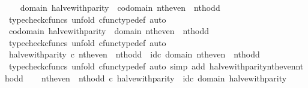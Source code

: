 \begin{isabellebody}
\ \ \isamarkupfalse%
\ {\isachardoublequoteopen}domain\ halve{\isacharunderscore}{\kern0pt}with{\isacharunderscore}{\kern0pt}parity\ {\isacharequal}{\kern0pt}\ codomain\ {\isacharparenleft}{\kern0pt}nth{\isacharunderscore}{\kern0pt}even\ {\isasymamalg}\ nth{\isacharunderscore}{\kern0pt}odd{\isacharparenright}{\kern0pt}{\isachardoublequoteclose}\isanewline
\ \ \ \ \isamarkupfalse%
\ {\isacharparenleft}{\kern0pt}typecheck{\isacharunderscore}{\kern0pt}cfuncs{\isacharcomma}{\kern0pt}\ unfold\ cfunc{\isacharunderscore}{\kern0pt}type{\isacharunderscore}{\kern0pt}def{\isacharcomma}{\kern0pt}\ auto{\isacharparenright}{\kern0pt}\isanewline
\ \ \isamarkupfalse%
\ {\isachardoublequoteopen}codomain\ halve{\isacharunderscore}{\kern0pt}with{\isacharunderscore}{\kern0pt}parity\ {\isacharequal}{\kern0pt}\ domain\ {\isacharparenleft}{\kern0pt}nth{\isacharunderscore}{\kern0pt}even\ {\isasymamalg}\ nth{\isacharunderscore}{\kern0pt}odd{\isacharparenright}{\kern0pt}{\isachardoublequoteclose}\isanewline
\ \ \ \ \isamarkupfalse%
\ {\isacharparenleft}{\kern0pt}typecheck{\isacharunderscore}{\kern0pt}cfuncs{\isacharcomma}{\kern0pt}\ unfold\ cfunc{\isacharunderscore}{\kern0pt}type{\isacharunderscore}{\kern0pt}def{\isacharcomma}{\kern0pt}\ auto{\isacharparenright}{\kern0pt}\isanewline
\ \ \isamarkupfalse%
\ {\isachardoublequoteopen}halve{\isacharunderscore}{\kern0pt}with{\isacharunderscore}{\kern0pt}parity\ {\isasymcirc}\isactrlsub c\ nth{\isacharunderscore}{\kern0pt}even\ {\isasymamalg}\ nth{\isacharunderscore}{\kern0pt}odd\ {\isacharequal}{\kern0pt}\ id\isactrlsub c\ {\isacharparenleft}{\kern0pt}domain\ {\isacharparenleft}{\kern0pt}nth{\isacharunderscore}{\kern0pt}even\ {\isasymamalg}\ nth{\isacharunderscore}{\kern0pt}odd{\isacharparenright}{\kern0pt}{\isacharparenright}{\kern0pt}{\isachardoublequoteclose}\isanewline
\ \ \ \ \isamarkupfalse%
\ {\isacharparenleft}{\kern0pt}typecheck{\isacharunderscore}{\kern0pt}cfuncs{\isacharcomma}{\kern0pt}\ unfold\ cfunc{\isacharunderscore}{\kern0pt}type{\isacharunderscore}{\kern0pt}def{\isacharcomma}{\kern0pt}\ auto\ simp\ add{\isacharcolon}{\kern0pt}\ halve{\isacharunderscore}{\kern0pt}with{\isacharunderscore}{\kern0pt}parity{\isacharunderscore}{\kern0pt}nth{\isacharunderscore}{\kern0pt}even{\isacharunderscore}{\kern0pt}nth{\isacharunderscore}{\kern0pt}odd{\isacharparenright}{\kern0pt}\isanewline
\ \ \isamarkupfalse%
\ {\isachardoublequoteopen}nth{\isacharunderscore}{\kern0pt}even\ {\isasymamalg}\ nth{\isacharunderscore}{\kern0pt}odd\ {\isasymcirc}\isactrlsub c\ halve{\isacharunderscore}{\kern0pt}with{\isacharunderscore}{\kern0pt}parity\ {\isacharequal}{\kern0pt}\ id\isactrlsub c\ {\isacharparenleft}{\kern0pt}domain\ halve{\isacharunderscore}{\kern0pt}with{\isacharunderscore}{\kern0pt}parity{\isacharparenright}{\kern0pt}{\isachardoublequoteclose}\isanewline

\end{isabellebody}
